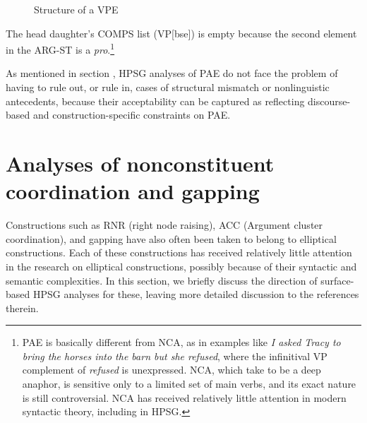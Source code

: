 \documentclass[output=paper
	        ,collection
	        ,collectionchapter
 	        ,biblatex
                ,babelshorthands
                ,newtxmath
                ,draftmode
                ,colorlinks, citecolor=brown
]{langscibook}
\begin{document}
{\begin{figure}[h!]
\caption{Structure of a VPE}\label{fig-53}
\end{figure}
%
The head daughter's COMPS list (VP[bse]) is empty because the second element in the ARG-ST
is a \textit{pro}.\footnote{PAE is basically different from NCA, as in examples like \textit{I asked Tracy to bring the horses into the barn but she refused}, where the infinitival VP complement of
\textit{refused} is unexpressed. NCA, which \citet{Hankamer1976} take to be a deep anaphor, is sensitive only to a limited set of main verbs, and its exact nature is still controversial. NCA has received relatively little attention in modern syntactic theory, including in HPSG.}

As mentioned in section \label{sec-structural-mismatches}, HPSG analyses of PAE do not face the problem of having to rule out, or rule in, cases of structural mismatch or nonlinguistic antecedents, because their acceptability can be captured as reflecting discourse-based and construction-specific constraints on PAE.



\section{Analyses of nonconstituent coordination and gapping}
\label{sec-analyses-of-noncon}

Constructions such as
RNR (right node raising), ACC (Argument cluster coordination), and gapping have also often been taken to belong
to elliptical constructions. Each of these constructions has received
relatively little attention in the research on elliptical constructions, possibly
because of their syntactic and semantic complexities. In this
section, we briefly discuss the direction of surface-based HPSG analyses
for these, leaving more detailed discussion
to the references therein.
%
%
%
%

}
\end{document}
